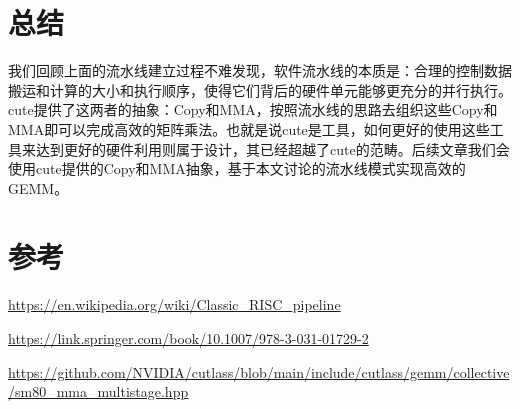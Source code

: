 \section{总结}

我们回顾上面的流水线建立过程不难发现，软件流水线的本质是：合理的控制数据搬运和计算的大小和执行顺序，使得它们背后的硬件单元能够更充分的并行执行。cute提供了这两者的抽象：Copy和MMA，按照流水线的思路去组织这些Copy和MMA即可以完成高效的矩阵乘法。也就是说cute是工具，如何更好的使用这些工具来达到更好的硬件利用则属于设计，其已经超越了cute的范畴。后续文章我们会使用cute提供的Copy和MMA抽象，基于本文讨论的流水线模式实现高效的GEMM。

\section{参考}

\url{https://en.wikipedia.org/wiki/Classic_RISC_pipeline}

\url{https://link.springer.com/book/10.1007/978-3-031-01729-2}

\url{https://github.com/NVIDIA/cutlass/blob/main/include/cutlass/gemm/collective/sm80_mma_multistage.hpp}
